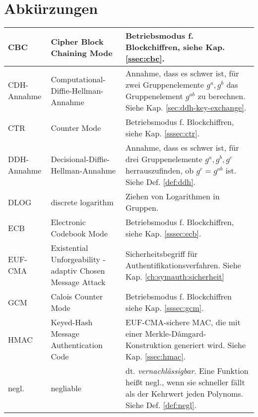 \section{Abkürzungen}
\begin{tabular}{p{} | p{} | p{}}
  CBC         & Cipher Block Chaining Mode                                 & Betriebsmodus f. Blockchiffren, siehe Kap. \ref{ssec:cbc}.       \\ \hline
  CDH-Annahme & Computational-Diffie-Hellman-Annahme                       & Annahme, dass es schwer ist, für zwei Gruppenelemente $g^a, g^b$                                
                                              das Gruppenelement $g^{ab}$ zu berechnen. Siehe Kap. \ref{sec:ddh-key-exchange}. \\ \hline
  CTR         & Counter Mode                                               & Betriebsmodus f. Blockchiffren, siehe Kap. \ref{sssec:ctr}.       \\ \hline
  DDH-Annahme & Decisional-Diffie-Hellman-Annahme                          & Annahme, dass es schwer ist, für drei Gruppenelemente                                           
                                  $g^a, g^b, g^c$ herrauszufinden, ob $g^c= g^{ab}$ ist. Siehe Def. \ref{def:ddh}. \\ \hline
  DLOG        & discrete logarithm                                         & Ziehen von Logarithmen in Gruppen.                               \\ \hline
  ECB         & Electronic Codebook Mode                                   & Betriebsmodus f. Blockchiffren, siehe Kap. \ref{sssec:ecb}.       \\ \hline
  EUF-CMA     & Existential Unforgeability - adaptiv Chosen Message Attack & Sicherheitsbegriff für Authentifikationsverfahren. Siehe Kap.                                   
                                           \ref{ch:symauth:sicherheit}                                      \\ \hline
  GCM         & Calois Counter Mode                                        & Betriebsmodus f. Blockchiffren  siehe Kap. \ref{sssec:gcm}.       \\ \hline
  HMAC        & Keyed-Hash Message Authentication Code                     & EUF-CMA-sichere MAC, die mit einer Merkle-Dåmgard-Konstruktion generiert wird.                  
                                                            Siehe Kap. \ref{ssec:hmac}.                                      \\ \hline
  negl.       & negliable                                                  & dt. \textit{vernachlässigbar}. Eine Funktion heißt negl., 
                                                                             wenn sie schneller fällt als der Kehrwert jeden Polynoms. Siehe Def. \ref{def:negl}.\\ \hline


\end{tabular}
